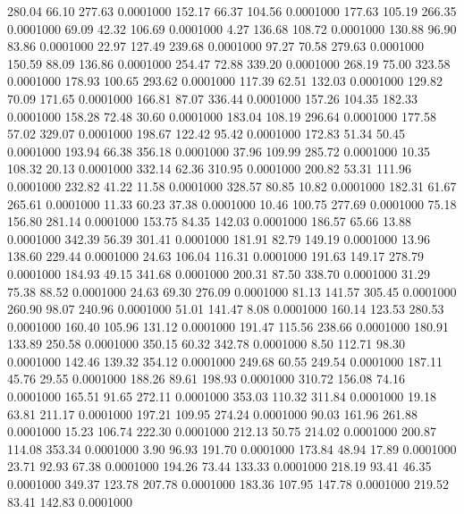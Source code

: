  280.04   66.10  277.63   0.0001000
 152.17   66.37  104.56   0.0001000
 177.63  105.19  266.35   0.0001000
  69.09   42.32  106.69   0.0001000
   4.27  136.68  108.72   0.0001000
 130.88   96.90   83.86   0.0001000
  22.97  127.49  239.68   0.0001000
  97.27   70.58  279.63   0.0001000
 150.59   88.09  136.86   0.0001000
 254.47   72.88  339.20   0.0001000
 268.19   75.00  323.58   0.0001000
 178.93  100.65  293.62   0.0001000
 117.39   62.51  132.03   0.0001000
 129.82   70.09  171.65   0.0001000
 166.81   87.07  336.44   0.0001000
 157.26  104.35  182.33   0.0001000
 158.28   72.48   30.60   0.0001000
 183.04  108.19  296.64   0.0001000
 177.58   57.02  329.07   0.0001000
 198.67  122.42   95.42   0.0001000
 172.83   51.34   50.45   0.0001000
 193.94   66.38  356.18   0.0001000
  37.96  109.99  285.72   0.0001000
  10.35  108.32   20.13   0.0001000
 332.14   62.36  310.95   0.0001000
 200.82   53.31  111.96   0.0001000
 232.82   41.22   11.58   0.0001000
 328.57   80.85   10.82   0.0001000
 182.31   61.67  265.61   0.0001000
  11.33   60.23   37.38   0.0001000
  10.46  100.75  277.69   0.0001000
  75.18  156.80  281.14   0.0001000
 153.75   84.35  142.03   0.0001000
 186.57   65.66   13.88   0.0001000
 342.39   56.39  301.41   0.0001000
 181.91   82.79  149.19   0.0001000
  13.96  138.60  229.44   0.0001000
  24.63  106.04  116.31   0.0001000
 191.63  149.17  278.79   0.0001000
 184.93   49.15  341.68   0.0001000
 200.31   87.50  338.70   0.0001000
  31.29   75.38   88.52   0.0001000
  24.63   69.30  276.09   0.0001000
  81.13  141.57  305.45   0.0001000
 260.90   98.07  240.96   0.0001000
  51.01  141.47    8.08   0.0001000
 160.14  123.53  280.53   0.0001000
 160.40  105.96  131.12   0.0001000
 191.47  115.56  238.66   0.0001000
 180.91  133.89  250.58   0.0001000
 350.15   60.32  342.78   0.0001000
   8.50  112.71   98.30   0.0001000
 142.46  139.32  354.12   0.0001000
 249.68   60.55  249.54   0.0001000
 187.11   45.76   29.55   0.0001000
 188.26   89.61  198.93   0.0001000
 310.72  156.08   74.16   0.0001000
 165.51   91.65  272.11   0.0001000
 353.03  110.32  311.84   0.0001000
  19.18   63.81  211.17   0.0001000
 197.21  109.95  274.24   0.0001000
  90.03  161.96  261.88   0.0001000
  15.23  106.74  222.30   0.0001000
 212.13   50.75  214.02   0.0001000
 200.87  114.08  353.34   0.0001000
   3.90   96.93  191.70   0.0001000
 173.84   48.94   17.89   0.0001000
  23.71   92.93   67.38   0.0001000
 194.26   73.44  133.33   0.0001000
 218.19   93.41   46.35   0.0001000
 349.37  123.78  207.78   0.0001000
 183.36  107.95  147.78   0.0001000
 219.52   83.41  142.83   0.0001000
